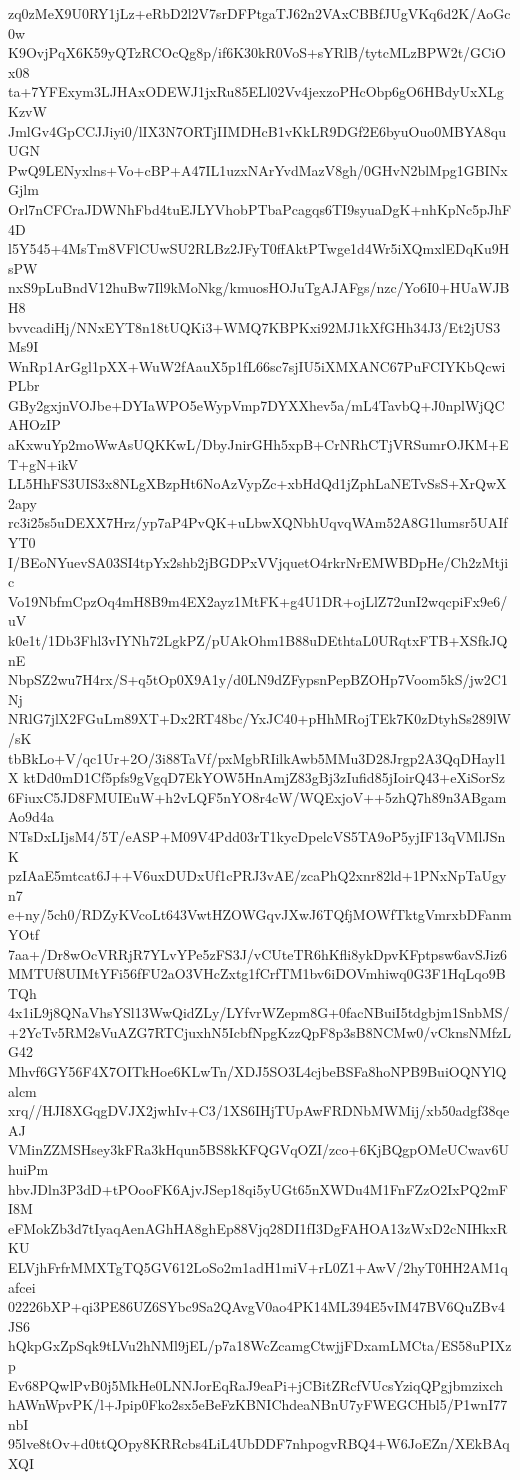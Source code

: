 zq0zMeX9U0RY1jLz+eRbD2l2V7srDFPtgaTJ62n2VAxCBBfJUgVKq6d2K/AoGc0w
K9OvjPqX6K59yQTzRCOcQg8p/if6K30kR0VoS+sYRlB/tytcMLzBPW2t/GCiOx08
ta+7YFExym3LJHAxODEWJ1jxRu85ELl02Vv4jexzoPHcObp6gO6HBdyUxXLgKzvW
JmlGv4GpCCJJiyi0/lIX3N7ORTjIIMDHcB1vKkLR9DGf2E6byuOuo0MBYA8quUGN
PwQ9LENyxlns+Vo+cBP+A47IL1uzxNArYvdMazV8gh/0GHvN2blMpg1GBINxGjlm
Orl7nCFCraJDWNhFbd4tuEJLYVhobPTbaPcagqs6TI9syuaDgK+nhKpNc5pJhF4D
l5Y545+4MsTm8VFlCUwSU2RLBz2JFyT0ffAktPTwge1d4Wr5iXQmxlEDqKu9HsPW
nxS9pLuBndV12huBw7Il9kMoNkg/kmuosHOJuTgAJAFgs/nzc/Yo6I0+HUaWJBH8
bvvcadiHj/NNxEYT8n18tUQKi3+WMQ7KBPKxi92MJ1kXfGHh34J3/Et2jUS3Ms9I
WnRp1ArGgl1pXX+WuW2fAauX5p1fL66sc7sjIU5iXMXANC67PuFCIYKbQcwiPLbr
GBy2gxjnVOJbe+DYIaWPO5eWypVmp7DYXXhev5a/mL4TavbQ+J0nplWjQCAHOzIP
aKxwuYp2moWwAsUQKKwL/DbyJnirGHh5xpB+CrNRhCTjVRSumrOJKM+ET+gN+ikV
LL5HhFS3UIS3x8NLgXBzpHt6NoAzVypZc+xbHdQd1jZphLaNETvSsS+XrQwX2apy
rc3i25s5uDEXX7Hrz/yp7aP4PvQK+uLbwXQNbhUqvqWAm52A8G1lumsr5UAIfYT0
I/BEoNYuevSA03SI4tpYx2shb2jBGDPxVVjquetO4rkrNrEMWBDpHe/Ch2zMtjic
Vo19NbfmCpzOq4mH8B9m4EX2ayz1MtFK+g4U1DR+ojLlZ72unI2wqcpiFx9e6/uV
k0e1t/1Db3Fhl3vIYNh72LgkPZ/pUAkOhm1B88uDEthtaL0URqtxFTB+XSfkJQnE
NbpSZ2wu7H4rx/S+q5tOp0X9A1y/d0LN9dZFypsnPepBZOHp7Voom5kS/jw2C1Nj
NRlG7jlX2FGuLm89XT+Dx2RT48bc/YxJC40+pHhMRojTEk7K0zDtyhSs289lW/sK
tbBkLo+V/qc1Ur+2O/3i88TaVf/pxMgbRIilkAwb5MMu3D28Jrgp2A3QqDHayl1X
ktDd0mD1Cf5pfs9gVgqD7EkYOW5HnAmjZ83gBj3zIufid85jIoirQ43+eXiSorSz
6FiuxC5JD8FMUIEuW+h2vLQF5nYO8r4cW/WQExjoV++5zhQ7h89n3ABgamAo9d4a
NTsDxLIjsM4/5T/eASP+M09V4Pdd03rT1kycDpelcVS5TA9oP5yjIF13qVMlJSnK
pzIAaE5mtcat6J++V6uxDUDxUf1cPRJ3vAE/zcaPhQ2xnr82ld+1PNxNpTaUgyn7
e+ny/5ch0/RDZyKVcoLt643VwtHZOWGqvJXwJ6TQfjMOWfTktgVmrxbDFanmYOtf
7aa+/Dr8wOcVRRjR7YLvYPe5zFS3J/vCUteTR6hKfli8ykDpvKFptpsw6avSJiz6
MMTUf8UIMtYFi56fFU2aO3VHcZxtg1fCrfTM1bv6iDOVmhiwq0G3F1HqLqo9BTQh
4x1iL9j8QNaVhsYSl13WwQidZLy/LYfvrWZepm8G+0facNBuiI5tdgbjm1SnbMS/
+2YcTv5RM2sVuAZG7RTCjuxhN5IcbfNpgKzzQpF8p3sB8NCMw0/vCknsNMfzLG42
Mhvf6GY56F4X7OITkHoe6KLwTn/XDJ5SO3L4cjbeBSFa8hoNPB9BuiOQNYlQalcm
xrq//HJI8XGqgDVJX2jwhIv+C3/1XS6IHjTUpAwFRDNbMWMij/xb50adgf38qeAJ
VMinZZMSHsey3kFRa3kHqun5BS8kKFQGVqOZI/zco+6KjBQgpOMeUCwav6UhuiPm
hbvJDln3P3dD+tPOooFK6AjvJSep18qi5yUGt65nXWDu4M1FnFZzO2IxPQ2mFI8M
eFMokZb3d7tIyaqAenAGhHA8ghEp88Vjq28DI1fI3DgFAHOA13zWxD2cNIHkxRKU
ELVjhFrfrMMXTgTQ5GV612LoSo2m1adH1miV+rL0Z1+AwV/2hyT0HH2AM1qafcei
02226bXP+qi3PE86UZ6SYbc9Sa2QAvgV0ao4PK14ML394E5vIM47BV6QuZBv4JS6
hQkpGxZpSqk9tLVu2hNMl9jEL/p7a18WcZcamgCtwjjFDxamLMCta/ES58uPIXzp
Ev68PQwlPvB0j5MkHe0LNNJorEqRaJ9eaPi+jCBitZRcfVUcsYziqQPgjbmzixch
hAWnWpvPK/l+Jpip0Fko2sx5eBeFzKBNIChdeaNBnU7yFWEGCHbl5/P1wnI77nbI
95lve8tOv+d0ttQOpy8KRRcbs4LiL4UbDDF7nhpogvRBQ4+W6JoEZn/XEkBAqXQI
